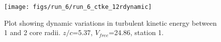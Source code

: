 \begin{figure}[H]
\centering
\texttt{[image: figs/run\_6/run\_6\_ctke\_12rdynamic]}
\caption{Plot showing dynamic variations in turbulent kinetic energy between 1 and 2 core radii. $z/c$=5.37, $V_{free}$=24.86, station 1.}
\label{fig:run_6_ctke_12rdynamic}
\end{figure}


